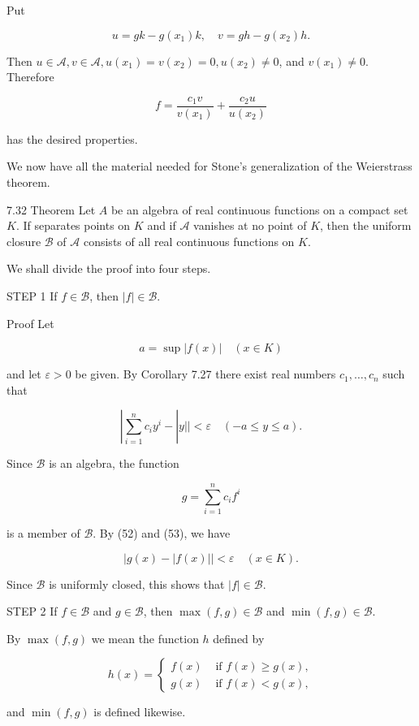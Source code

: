 \documentclass[10pt]{article}
\begin{document}
Put

$$
u=g k-g\left(x_{1}\right) k, \quad v=g h-g\left(x_{2}\right) h .
$$

Then $u \in \mathscr{A}, v \in \mathscr{A}, u\left(x_{1}\right)=v\left(x_{2}\right)=0, u\left(x_{2}\right) \neq 0$, and $v\left(x_{1}\right) \neq 0$. Therefore

$$
f=\frac{c_{1} v}{v\left(x_{1}\right)}+\frac{c_{2} u}{u\left(x_{2}\right)}
$$

has the desired properties.

We now have all the material needed for Stone's generalization of the Weierstrass theorem.

7.32 Theorem Let $A$ be an algebra of real continuous functions on a compact set $K$. If separates points on $K$ and if $\mathscr{A}$ vanishes at no point of $K$, then the uniform closure $\mathscr{B}$ of $\mathscr{A}$ consists of all real continuous functions on $K$.

We shall divide the proof into four steps.

STEP 1 If $f \in \mathscr{B}$, then $|f| \in \mathscr{B}$.

Proof Let

$$
a=\sup |f(x)| \quad(x \in K)
$$

and let $\varepsilon>0$ be given. By Corollary 7.27 there exist real numbers $c_{1}, \ldots, c_{n}$ such that

$$
\left|\sum_{i=1}^{n} c_{i} y^{i}-\right| y||<\varepsilon \quad(-a \leq y \leq a) .
$$

Since $\mathscr{B}$ is an algebra, the function

$$
g=\sum_{i=1}^{n} c_{i} f^{i}
$$

is a member of $\mathscr{B}$. By (52) and (53), we have

$$
|g(x)-| f(x)||<\varepsilon \quad(x \in K) .
$$

Since $\mathscr{B}$ is uniformly closed, this shows that $|f| \in \mathscr{B}$.

STEP 2 If $f \in \mathscr{B}$ and $g \in \mathscr{B}$, then $\max (f, g) \in \mathscr{B}$ and $\min (f, g) \in \mathscr{B}$.

By $\max (f, g)$ we mean the function $h$ defined by

$$
h(x)= \begin{cases}f(x) & \text { if } f(x) \geq g(x), \\ g(x) & \text { if } f(x)<g(x),\end{cases}
$$

and $\min (f, g)$ is defined likewise.
\end{document}
